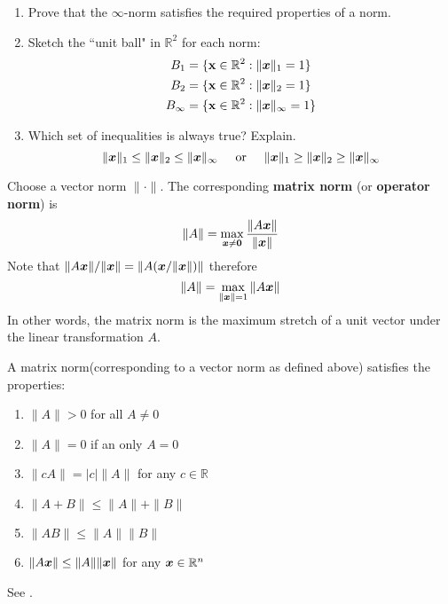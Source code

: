 \begin{example} \phantom{.}
\begin{enumerate}
\item Prove that the $\infty$-norm satisfies the required properties of a norm.
\item Sketch the ``unit ball" in $\mathbb{R}^2$ for each norm:
\begin{align*}
B_1 &= \{ \mathbf{x} \in \mathbb{R}^2 : \| \boldsymbol{x} \|_1 = 1 \} \\
B_2 &= \{ \mathbf{x} \in \mathbb{R}^2 : \| \boldsymbol{x} \|_2 = 1 \} \\
B_{\infty} &= \{ \mathbf{x} \in \mathbb{R}^2 : \| \boldsymbol{x} \|_{\infty} = 1 \}
\end{align*}
\item Which set of inequalities is always true? Explain.
$$
\| \boldsymbol{x} \|_1 \leq \| \boldsymbol{x} \|_2 \leq \| \boldsymbol{x} \|_{\infty}
\hspace{5mm} \text{or} \hspace{5mm}
\| \boldsymbol{x} \|_1 \geq \| \boldsymbol{x} \|_2 \geq \| \boldsymbol{x} \|_{\infty}
$$
\end{enumerate}
\end{example}

\begin{definition}
Choose a vector norm $\| \cdot \|$. The corresponding {\bf matrix norm} (or {\bf operator norm}) \cite[p.54]{MH} is
$$
\| A \| = \max_{\boldsymbol{x} \not= \boldsymbol{0} } \frac{\| A \boldsymbol{x} \|}{ \| \boldsymbol{x}  \|}
$$
Note that $\| A \boldsymbol{x} \| / \| \boldsymbol{x} \|= \| A ( \boldsymbol{x} / \| \boldsymbol{x} \| ) \|$ therefore
$$
\| A \| = \max_{ \| \boldsymbol{x} \| = 1 } \| A \boldsymbol{x} \|
$$
In other words, the matrix norm is the maximum stretch of a unit vector under the linear transformation $A$.
\end{definition}

\begin{proposition}
A matrix norm(corresponding to a vector norm as defined above) satisfies the properties:
\begin{enumerate}
\item $\| A \| > 0$ for all $A \not= 0$
\item $\| A \| = 0$ if an only $A = 0$
\item $\| c A \| = |c| \| A \|$ for any $c \in \mathbb{R}$
\item $\| A + B \| \leq \| A \| + \| B \|$
\item $\| A B \| \leq \| A \| \| B \|$
\item $\| A \boldsymbol{x} \| \leq \| A \| \| \boldsymbol{x} \|$ for any $\boldsymbol{x} \in \mathbb{R}^n$
\end{enumerate}
See \cite[p.54]{MH}.
\end{proposition}

